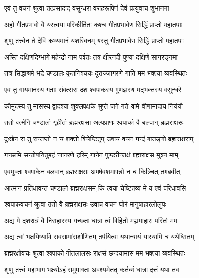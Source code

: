 \twolineshloka
{एवं तु वचनं श्रुत्वा तत्प्रसादाद् वसुन्धरा}
{वराहरूपिणं देवं प्रत्युवाच शुभानना}%


\twolineshloka
{अहो गीतप्रभावो वै यस्त्वया परिकीर्तितः}
{कश्च गीतप्रभावेण सिद्धिं प्राप्तो महातपाः}%



\twolineshloka
{शृणु तत्त्वेन ते देवि कथ्यमानं यशस्विनम्}
{यस्तु गीतप्रभावेण सिद्धिं प्राप्तो महातपाः}%

\twolineshloka
{अस्ति दक्षिणदिग्भागे महेन्द्रो नाम पर्वतः}
{तत्र क्षीरनदी पुण्या दक्षिणे सागरङ्गमा}%

\twolineshloka
{तत्र सिद्धाश्रमे भद्रे चण्डालः कृतनिश्चयः}
{दूराज्जागरणे गाति मम भक्त्या व्यवस्थितः}%

\twolineshloka
{एवं तु गायमानस्य गताः संवत्सरा दश}
{श्वपाकस्य गुणज्ञस्य मद्भक्तस्य वसुन्धरे}%

\twolineshloka
{कौमुदस्य तु मासस्य द्वादश्यां शुक्लपक्षके}
{सुप्ते जने गते यामे वीणामादाय निर्ययौ}%

\twolineshloka
{ततो वर्त्मनि चण्डालो गृहीतो ब्रह्मरक्षसा}
{अल्पप्राणः श्वपाको वै बलवान् ब्रह्मराक्षसः}%

\twolineshloka
{दुःखेन स तु सन्तप्तो न च शक्तो विचेष्टितुम्}
{उवाच वचनं मन्दं मातङ्गो ब्रह्मराक्षसम्}%

\twolineshloka
{गच्छामि सन्तोषयितुमहं जागरणे हरिम्}
{गानेन पुण्डरीकाक्षं ब्रह्मराक्षस मुञ्च माम्}%

\twolineshloka
{एवमुक्तः श्वपाकेन बलवान् ब्रह्मराक्षसः}
{अमर्षवशमापन्नो न च किञ्चित् तमब्रवीत्}%

\twolineshloka
{आत्मानं प्रतिधावन्तं चण्डालो ब्रह्मराक्षसम्}
{किं त्वया चेष्टितव्यं मे य एवं परिधावसि}%

\twolineshloka
{श्वपाकवचनं श्रुत्वा ततो वै ब्रह्मराक्षसः}
{उवाच वचनं घोरं मानुषाहारलोलुपः}%

\twolineshloka
{अद्य मे दशरात्रं वै निराहारस्य गच्छतः}
{धात्रा त्वं विहितो मह्यमाहारः परितो मम}%

\twolineshloka
{अद्य त्वां भक्षयिष्यामि सवसामांसशोणितम्}
{तर्पयित्वा यथान्यायं यास्यामि च यथेप्सितम्}%

\twolineshloka
{ब्रह्मरक्षोवचः श्रुत्वा श्वपाको गीतलालसः}
{राक्षसं छन्दयामास मम भक्त्या व्यवस्थितः}%

\twolineshloka
{शृणु तत्त्वं महाभाग भक्ष्योऽहं समुपागतः}
{अवश्यमेतत् कर्तव्यं धात्रा दत्तं यथा तव}%

